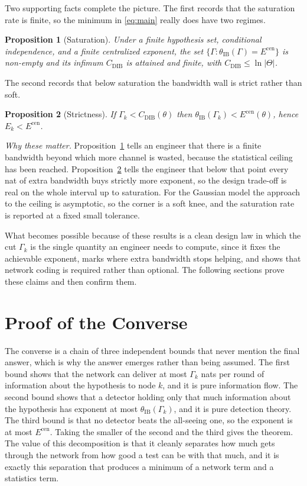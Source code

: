\documentclass[journal]{IEEEtran}
\newtheorem{proposition}{Proposition}
\theoremstyle{definition}
\theoremstyle{remark}
\newcommand{\Ecen}{E^{\mathrm{cen}}}
\newcommand{\tib}{\theta_{\mathrm{IB}}}
\newcommand{\Gk}{\Gamma_k}
\newcommand{\Cdib}{C_{\mathrm{DIB}}}
\begin{document}
Two supporting facts complete the picture. The first records that the saturation rate is finite, so the minimum in
\eqref{eq:main} really does have two regimes.

\begin{proposition}[Saturation]\label{prop:sat}
Under a finite hypothesis set, conditional independence, and a finite centralized exponent, the set
$\{\Gamma:\tib(\Gamma)=\Ecen\}$ is non-empty and its infimum $\Cdib$ is attained and finite, with
$\Cdib\le\ln|\Theta|$.
\end{proposition}

The second records that below saturation the bandwidth wall is strict rather than soft.

\begin{proposition}[Strictness]\label{prop:strict}
If $\Gk<\Cdib(\theta)$ then $\tib(\Gk)<\Ecen(\theta)$, hence $E_k<\Ecen$.
\end{proposition}

\textit{Why these matter.} Proposition~\ref{prop:sat} tells an engineer that there is a finite bandwidth beyond
which more channel is wasted, because the statistical ceiling has been reached. Proposition~\ref{prop:strict}
tells the engineer that below that point every nat of extra bandwidth buys strictly more exponent, so the design
trade-off is real on the whole interval up to saturation. For the Gaussian model the approach to the ceiling is
asymptotic, so the corner is a soft knee, and the saturation rate is reported at a fixed small tolerance.

What becomes possible because of these results is a clean design law in which the cut $\Gk$ is the single quantity
an engineer needs to compute, since it fixes the achievable exponent, marks where extra bandwidth stops helping,
and shows that network coding is required rather than optional. The following sections prove these claims and then
confirm them.

\section{Proof of the Converse}\label{sec:converse}
The converse is a chain of three independent bounds that never mention the final answer, which is why the answer
emerges rather than being assumed. The first bound shows that the network can deliver at most $\Gk$ nats per round
of information about the hypothesis to node $k$, and it is pure information flow. The second bound shows that a
detector holding only that much information about the hypothesis has exponent at most $\tib(\Gk)$, and it is pure
detection theory. The third bound is that no detector beats the all-seeing one, so the exponent is at most
$\Ecen$. Taking the smaller of the second and the third gives the theorem. The value of this decomposition is that
it cleanly separates how much gets through the network from how good a test can be with that much, and it is
exactly this separation that produces a minimum of a network term and a statistics term.
\end{document}
